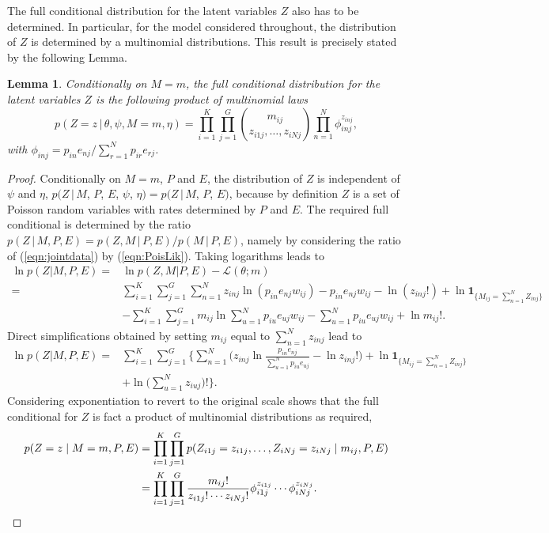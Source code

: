 \documentclass[11pt]{amsart}
\newtheorem{lemma}{Lemma}
\theoremstyle{definition}
\theoremstyle{remark}
\begin{document}
The full conditional distribution for the latent variables $Z$ also
has to be determined. In particular, for the model considered
throughout, the distribution of $Z$ is determined by a multinomial
distributions. This result is precisely stated by the following
Lemma.

\begin{lemma}\label{lem:Full_for_Z} Conditionally on  $M= m$, the full
  conditional distribution for the latent variables $Z$ is the
  following  product of multinomial laws 
\[
   p(Z = z\,|\, \theta, \psi, M=m, \eta)
   = 
   \prod_{i=1}^K\prod_{j=1}^G {m_{ij} \choose z_{i1j}, \ldots,
     z_{iNj}} 
   \prod_{n=1}^N \phi_{inj}^{z_{inj}},
\]
with $\phi_{inj} = p_{in} e_{nj}/\sum_{r=1}^N p_{ir}e_{rj}$.
\end{lemma}

\begin{proof} 
Conditionally on $M = m$, $P$ and $E$, the distribution of $Z$ is
independent of $\psi$ and $\eta$, $p(Z\,|\, M$, $P$, $E$, $\psi$, $\eta)
= p(Z\,|\, M$, $P$, $E)$, because by definition $Z$ is a set of
Poisson random variables with rates determined by $P$ and $E$. The
required full conditional is determined by the ratio $p(Z\,|\,M, P, E)
= p(Z,  M\,|\, P,E)/p(M\,|\,P, E)$, namely by considering the ratio 
of (\ref{eqn:jointdata}) by (\ref{eqn:PoisLik}). Taking logarithms
leads to
\begin{align*}
    \ln p(Z|M, P, E) 
  =&
    \ln p(Z, M|P, E) - \mathcal L(\theta; m) \\
  =&
    \sum_{i=1}^K \sum_{j=1}^G \sum_{n=1}^N z_{inj}
     \ln(p_{in}e_{nj}w_{ij}) - 
     p_{in}e_{nj}w_{ij} - \ln(z_{inj}!) +\ln \mathbf{1}_{\big\{M_{ij} =
     \sum_{n=1}^N Z_{inj}\big\}} \\ 
    & -\sum_{i=1}^K \sum_{j=1}^G m_{ij}\ln \sum_{u=1}^N
      p_{iu}e_{uj}w_{ij} - 
      \sum_{u=1}^N p_{iu}e_{uj}w_{ij} + \ln m_{ij}!.
\end{align*}
Direct simplifications obtained by  setting $m_{ij}$ equal to
$\sum_{n=1}^N  z_{inj}$ lead to  
\begin{align*}
    \ln p(Z|M, P, E) 
  =&
    \sum_{i=1}^K \sum_{j=1}^G\Big\{
       \sum_{n=1}^N \Big(
           z_{inj} \ln\frac{p_{in}e_{nj}}{\sum_{u=1}^N
           p_{iu}e_{uj}} - \ln z_{inj}!
       \Big) + 
       \ln \mathbf{1}_{\big\{M_{ij} = \sum_{n=1}^N Z_{inj}
     \big\}} \\
     &+ \ln \big(\sum_{u=1}^N z_{iuj}\big)!
   \Big\}.
\end{align*}
Considering exponentiation to revert to the original scale shows that
the full conditional for $Z$ is fact a product of multinomial
distributions as required,
\begin{align}
       p(Z = z\mid M = m, P, E) 
     &= 
       \prod_{i=1}^K \prod_{j=1}^G
       p(Z_{i1j} = z_{i1j}, \ldots, Z_{iNj} =
       z_{iNj}\mid m_{ij}, P, E) \notag\\ 
     &=
       \prod_{i=1}^K \prod_{j=1}^G
       \frac{m_{ij}!}{z_{i1j}!\cdots z_{iNj}!}
        \phi_{i1j}^{z_{i1j}} \cdots
       \phi_{iNj}^{z_{iNj}}. \notag\qedhere
\end{align}
\end{proof}
\end{document}
